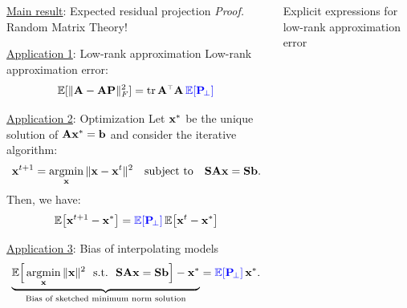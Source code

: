 \documentclass{beamer}
\begin{document}
\begin{frame}
\begin{columns}
\begin{column}{0.28\textwidth}
\begin{block}{\underline{Main result}: Expected residual projection}
\textit{Proof.}  Random Matrix Theory!
\vspace{3mm}

\end{block}

\begin{block}{\underline{Application 1}: Low-rank approximation}
  \vspace{5mm}
    Low-rank approximation error:
    \begin{align*}
      \E[\|\A - \A\P\|_F^2]= \tr\,\A^\top\A\,\Blue{\E[\P_{\!\perp}]}
    \end{align*}
  \vspace{-3mm}  
\end{block}

\begin{block}{\underline{Application 2}: Optimization}
    \vspace{5mm}
Let $\mathbf x^*$ be the unique solution of $\mathbf A\mathbf x^*=\mathbf b$ and consider
  the iterative algorithm:
  \begin{align*}
    \mathbf x^{t+1} = \operatorname*{\mathop{\mathrm{argmin}}}_\mathbf x\|\mathbf x-\mathbf x^t\|^2\quad\textnormal{subject to}\quad\mathbf{S}\mathbf A\mathbf x=\mathbf{S}\mathbf b.
  \end{align*}
Then, we have:
  \begin{align*}
    \mathbb E\big[\mathbf x^{t+1}-\mathbf x^*\big] =
\color{blue}{\mathbb E[\mathbf P_{\!\perp}]}\color{black}\,\mathbb E\big[\mathbf x^t-\mathbf x^*\big]
  \end{align*}
    \vspace{-3mm}
\end{block}

\begin{block}{\underline{Application 3}: Bias of interpolating models}
\begin{align*}
  \underbrace{\mathbb E\Big[\operatorname*{\mathop{\mathrm{argmin}}}_\mathbf x\|\mathbf x\|^2\ \ \textnormal{s.t.}\ \
    \mathbf{S}\mathbf A\mathbf x=\mathbf{S}\mathbf b\Big] - \mathbf x^*}_{\text{Bias of sketched minimum norm
  solution}}
  = \color{blue}{\mathbb E[\mathbf P_{\!\perp}]}\color{black}\,\mathbf x^*.
\end{align*}
  \vspace{5mm}
  \end{block}

\end{column}

\begin{column}{.4\textwidth}

  \begin{block}{Explicit expressions for low-rank approximation error}
    \vspace{5mm}
    

\end{block}
\end{column}
\end{columns}
\end{frame}
\end{document}

